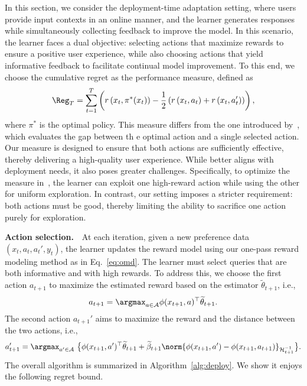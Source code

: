In this section, we consider the deployment-time adaptation setting, where users provide input contexts in an online manner, and the learner generates responses while simultaneously collecting feedback to improve the model. In this scenario, the learner faces a dual objective: selecting actions that maximize rewards to ensure a positive user experience, while also choosing actions that yield informative feedback to facilitate continual model improvement. To this end, we choose the cumulative regret as the performance measure, defined as
\begin{align}
  \label{eq:deploy-regret}
  {\Reg}_T = \sum_{t=1}^T \left(r\left(x_t, \pi^*(x_t)\right)- \frac{1}{2} \left(r\left(x_t, a_t\right) + r\left(x_t, a'_t\right)\right)\right),
\end{align}
where $\pi^*$ is the optimal policy. This measure differs from the one introduced by~\citet{arXiv'24:Ji-RLHF-active}, which evaluates the gap between th  e optimal action and a single selected action. Our measure is designed to ensure that both actions are sufficiently effective, thereby delivering a high-quality user experience. While better aligns with deployment needs, it also poses greater challenges. Specifically, to optimize the measure in~\citet{arXiv'24:Ji-RLHF-active}, the learner can exploit one high-reward action while using the other for uniform exploration. In contrast, our setting imposes a stricter requirement: both actions must be good, thereby limiting the ability to sacrifice one action purely for exploration.

\textbf{Action selection.}~~At each iteration, given a new preference data $(x_t, a_t, a_t', y_t)$, the learner updates the reward model using our one-pass reward modeling method as in Eq.~\eqref{eq:omd}. The learner must select queries that are both informative and with high rewards. To address this, we choose the first action $a_{t+1}$ to maximize the estimated reward based on the estimator $\widetilde{\theta}_{t+1}$, i.e.,
\begin{align}
  \label{eq:first-action}
  a_{t+1} = \argmax_{a \in \mathcal{A}} \phi(x_{t+1}, a)^\top \widetilde{\theta}_{t+1}.
\end{align}
The second action $a_{t+1}'$ aims to maximize the reward and the distance between the two actions, i.e.,
\begin{align}
  \label{eq:second-action}
  a_{t+1}' = \argmax_{a' \in \mathcal{A}}~ \big\{\phi(x_{t+1}, a')^\top \widetilde{\theta}_{t+1} + \widetilde{\beta}_{t+1} \norm{\phi(x_{t+1}, a') - \phi(x_{t+1}, a_{t+1})}_{\mathcal{H}_{t+1}^{-1}}\big\} .
\end{align}
The overall algorithm is summarized in Algorithm~\ref{alg:deploy}. We show it enjoys the following regret bound.

